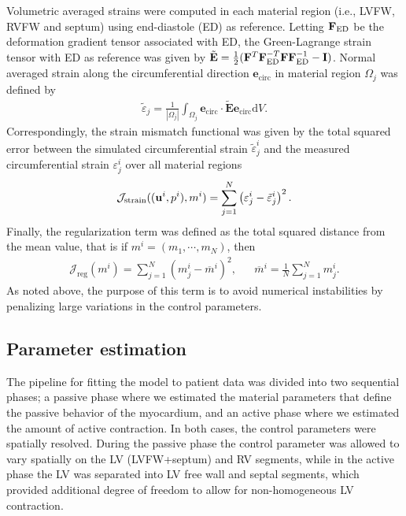 Volumetric averaged strains were computed in each material region
(i.e., LVFW, RVFW and septum) using end-diastole (ED) as
reference. Letting $\mathbf{F}_{\mathrm{ED}}$ be the deformation gradient
tensor associated with ED, the Green-Lagrange strain tensor with ED as
reference was given by $\tilde{\mathbf{E}} =
\frac{1}{2}(\mathbf{F}^T\mathbf{F}_{\mathrm{ED}}^{-T} \mathbf{F}\mathbf{F}_{\mathrm{ED}}^{-1} -\mathbf{I})$.
Normal averaged strain along the circumferential direction
$\mathbf{e}_{\mathrm{circ}}$ in material region $\Omega_j$ was 
defined by 
\begin{align}
   \tilde{\varepsilon}_{j} = \frac{1}{|\Omega_j|}
   \int_{\Omega_j}\mathbf{e}_{\mathrm{circ}} \cdot \tilde{\mathbf{E}} \mathbf{e}_{\mathrm{circ}} \mathrm{d} V .
\end{align}
Correspondingly, the strain mismatch functional was given by the total
squared error between the simulated circumferential strain
$\tilde{\varepsilon}_{j}^i$ and the measured circumferential strain
$\varepsilon_{j}^i$ over all material regions 
\begin{equation}
  \mathcal{J}_{\mathrm{strain}}((\mathbf{u}^i, p^i), m^i)  =\sum_{j= 1}^{N} \left( \varepsilon_{j}^i -  \tilde{\varepsilon}_{j}^i \right)^2.
  \label{paper3:eq:I_strain}
\end{equation}
Finally, the regularization term was defined as the total squared distance
from the mean value, that is if $m^i = (m_1, \cdots, m_N)$, then
\begin{align}
\mathcal{J}_{\mathrm{reg}}(m^i) = \sum_{j=1}^{N} (m_j^i - \overline{m}^i )^2 , &&  \overline{m}^i = \frac{1}{N} \sum_{j=1}^{N} m_j^i.
\end{align}
As noted above, the purpose of this term is to avoid numerical
instabilities by penalizing large variations in the control parameters.




\subsection{Parameter estimation}
The pipeline for fitting the model to patient data was 
divided into two sequential phases; a passive phase where we estimated the
material parameters that define the passive behavior of the
myocardium, and an active phase where we estimated the amount
of active contraction.
In both cases, the control parameters were 
spatially resolved. During the passive phase the control parameter was
allowed to vary spatially on the LV (LVFW+septum) and RV segments, while in the active
phase the LV was separated into LV free wall and septal segments, which provided
additional degree of freedom to allow for non-homogeneous LV contraction.


